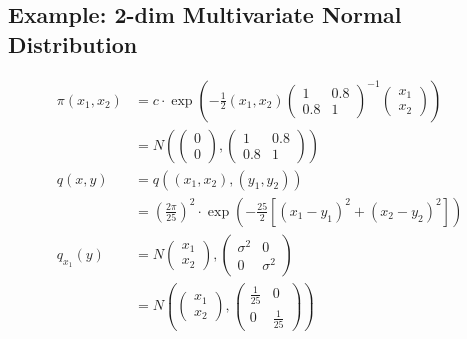 \documentclass[12pt]{article}
\begin{document}
        \subsection{Example: 2-dim Multivariate Normal Distribution}
            \begin{align*}
                \pi(x_1, x_2) &= c \cdot \exp\left(-\frac{1}{2}(x_1, x_2) \begin{pmatrix}
                    1 & 0.8\\
                    0.8 & 1
                \end{pmatrix}^{-1} \begin{pmatrix}
                    x_1\\x_2
                \end{pmatrix}\right)\\
                &= N\left(\begin{pmatrix}
                    0\\0
                \end{pmatrix}, \begin{pmatrix}
                    1 & 0.8\\
                    0.8 & 1
                \end{pmatrix}\right)\\
                q(x, y) &= q((x_1, x_2), (y_1, y_2))\\
                &= \left(\frac{2\pi}{25}\right)^2 \cdot \exp\left(-\frac{25}{2}\left[(x_1 - y_1)^2 + (x_2 - y_2)^2\right]\right)\\
                q_{x_1}(y) &= N\begin{pmatrix}
                    x_1\\x_2
                \end{pmatrix}, \begin{pmatrix}
                    \sigma^2 & 0\\
                    0 & \sigma^2
                \end{pmatrix}\\
                &= N\left(\begin{pmatrix}
                    x_1\\x_2
                \end{pmatrix}, \begin{pmatrix}
                    \frac{1}{25} & 0\\
                    0 & \frac{1}{25}
                \end{pmatrix}\right)
            \end{align*}
\end{document}
